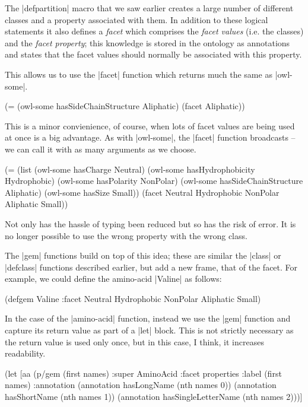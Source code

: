 The |defpartition| macro that we saw earlier creates a large number of
different classes and a property associated with them. In addition to
these logical statements it also defines a \emph{facet} which
comprises the \emph{facet values} (i.e. the classes) and the
\emph{facet property}; this knowledge is stored in the ontology as
annotations and states that the facet values should normally be
associated with this property.

This allows us to use the |facet| function which returns much the same
as |owl-some|.

\begin{tawnyexample}
(=
  (owl-some hasSideChainStructure Aliphatic)
  (facet Aliphatic))
\end{tawnyexample}

This is a minor convienience, of course, when lots of facet values are
being used at once is a big advantage. As with |owl-some|, the |facet|
function broadcasts -- we can call it with as many arguments as we
choose.

\begin{tawnyexample}
(=
  (list
    (owl-some hasCharge Neutral)
    (owl-some hasHydrophobicity Hydrophobic)
    (owl-some hasPolarity NonPolar)
    (owl-some hasSideChainStructure Aliphatic)
    (owl-some hasSize Small))     
  (facet Neutral Hydrophobic NonPolar Aliphatic Small))
\end{tawnyexample}

Not only has the hassle of typing been reduced but so has the risk of
error. It is no longer possible to use the wrong property with the
wrong class.

The |gem| functions build on top of this idea; these are similar the
|class| or |defclass| functions described earlier, but add a new
frame, that of the facet. For example, we could define the amino-acid
|Valine| as follows:

\begin{tawnyexample}
(defgem Valine
  :facet Neutral Hydrophobic NonPolar Aliphatic Small)
\end{tawnyexample}

In the case of the |amino-acid| function, instead we use the |gem|
function and capture its return value as part of a |let| block. This
is not strictly necessary as the return value is used only once, but
in this case, I think, it increases readability.

\begin{tawny}
  (let [aa (p/gem (first names)
                :super AminoAcid
                :facet properties
                :label (first names)
                :annotation
                (annotation hasLongName (nth names 0))
                (annotation hasShortName (nth names 1))
                (annotation hasSingleLetterName (nth names 2)))]
\end{tawny}


